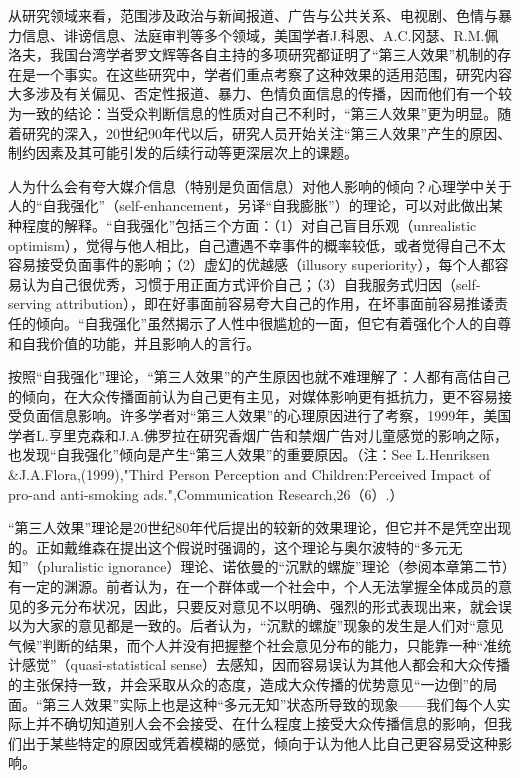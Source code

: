 \documentclass[UTF8,12pt]{ctexart}
\numberwithin{equation}{section} %
\numberwithin{figure}{section}
\numberwithin{table}{section}
\begin{document}
	从研究领域来看，范围涉及政治与新闻报道、广告与公共关系、电视剧、色情与暴力信息、诽谤信息、法庭审判等多个领域，美国学者J.科恩、A.C.冈瑟、R.M.佩洛夫，我国台湾学者罗文辉等各自主持的多项研究都证明了“第三人效果”机制的存在是一个事实。在这些研究中，学者们重点考察了这种效果的适用范围，研究内容大多涉及有关偏见、否定性报道、暴力、色情负面信息的传播，因而他们有一个较为一致的结论：当受众判断信息的性质对自己不利时，“第三人效果”更为明显。随着研究的深入，20世纪90年代以后，研究人员开始关注“第三人效果”产生的原因、制约因素及其可能引发的后续行动等更深层次上的课题。
	
	人为什么会有夸大媒介信息（特别是负面信息）对他人影响的倾向？心理学中关于人的“自我强化”（self-enhancement，另译“自我膨胀”）的理论，可以对此做出某种程度的解释。“自我强化”包括三个方面：（1）对自己盲目乐观（unrealistic optimism），觉得与他人相比，自己遭遇不幸事件的概率较低，或者觉得自己不太容易接受负面事件的影响；（2）虚幻的优越感（illusory superiority），每个人都容易认为自己很优秀，习惯于用正面方式评价自己；（3）自我服务式归因（self-serving attribution），即在好事面前容易夸大自己的作用，在坏事面前容易推诿责任的倾向。“自我强化”虽然揭示了人性中很尴尬的一面，但它有着强化个人的自尊和自我价值的功能，并且影响人的言行。
	
	按照“自我强化”理论，“第三人效果”的产生原因也就不难理解了：人都有高估自己的倾向，在大众传播面前认为自己更有主见，对媒体影响更有抵抗力，更不容易接受负面信息影响。许多学者对“第三人效果”的心理原因进行了考察，1999年，美国学者L.亨里克森和J.A.佛罗拉在研究香烟广告和禁烟广告对儿童感觉的影响之际，也发现“自我强化”倾向是产生“第三人效果”的重要原因。（注：See L.Henriksen \&J.A.Flora,(1999),"Third Person Perception and Children:Perceived Impact of pro-and anti-smoking ads.",Communication Research,26（6）.）
	
	“第三人效果”理论是20世纪80年代后提出的较新的效果理论，但它并不是凭空出现的。正如戴维森在提出这个假说时强调的，这个理论与奥尔波特的“多元无知”（pluralistic ignorance）理论、诺依曼的“沉默的螺旋”理论（参阅本章第二节）有一定的渊源。前者认为，在一个群体或一个社会中，个人无法掌握全体成员的意见的多元分布状况，因此，只要反对意见不以明确、强烈的形式表现出来，就会误以为大家的意见都是一致的。后者认为，“沉默的螺旋”现象的发生是人们对“意见气候”判断的结果，而个人并没有把握整个社会意见分布的能力，只能靠一种“准统计感觉”（quasi-statistical sense）去感知，因而容易误认为其他人都会和大众传播的主张保持一致，并会采取从众的态度，造成大众传播的优势意见“一边倒”的局面。“第三人效果”实际上也是这种“多元无知”状态所导致的现象——我们每个人实际上并不确切知道别人会不会接受、在什么程度上接受大众传播信息的影响，但我们出于某些特定的原因或凭着模糊的感觉，倾向于认为他人比自己更容易受这种影响。
	
\end{document}
